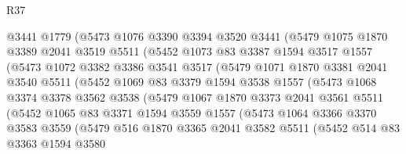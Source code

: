 \begin{lexlean}{R37}
\begin{coremodule}
              @3441
              @1779
              (@5473
                @1076
                @3390
                @3394
                @3520
                @3441
                (@5479
                  @1075
                  @1870
                  @3389
                  @2041
                  @3519
                  @5511
                  (@5452
                    @1073
                    @83
                    @3387
                    @1594
                    @3517
                    @1557
                    (@5473
                      @1072
                      @3382
                      @3386
                      @3541
                      @3517
                      (@5479
                        @1071
                        @1870
                        @3381
                        @2041
                        @3540
                        @5511
                        (@5452
                          @1069
                          @83
                          @3379
                          @1594
                          @3538
                          @1557
                          (@5473
                            @1068
                            @3374
                            @3378
                            @3562
                            @3538
                            (@5479
                              @1067
                              @1870
                              @3373
                              @2041
                              @3561
                              @5511
                              (@5452
                                @1065
                                @83
                                @3371
                                @1594
                                @3559
                                @1557
                                (@5473
                                  @1064
                                  @3366
                                  @3370
                                  @3583
                                  @3559
                                  (@5479
                                    @516
                                    @1870
                                    @3365
                                    @2041
                                    @3582
                                    @5511
                                    (@5452
                                      @514
                                      @83
                                      @3363
                                      @1594
                                      @3580

\end{coremodule}
\end{lexlean}
